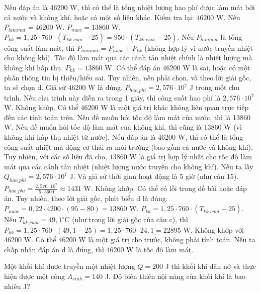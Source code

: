 \begin{ex}
{Nếu đáp án là 46200 W, thì có thể là tổng nhiệt lượng hao phí được làm mát bởi cả nước và không khí, hoặc có một số liệu khác.
Kiểm tra lại: $46200$ W.
Nếu $P_{lammat} = 46200$ W.
$P_{nuoc} = 13860$ W.
$P_{kk} = 1,25 \cdot 760 \cdot (T_{kk\_cuoi} - 25) = 950 \cdot (T_{kk\_cuoi} - 25)$.
Nếu $P_{lammat}$ là tổng công suất làm mát, thì $P_{lammat} = P_{nuoc} + P_{kk}$ (không hợp lý vì nước truyền nhiệt cho không khí).
Tốc độ làm mát qua các cánh tản nhiệt chính là nhiệt lượng mà không khí hấp thụ.
$P_{kk} = 13860$ W.
Có thể đáp án 46200 W là sai, hoặc có một phần thông tin bị thiếu/hiểu sai.
Tuy nhiên, nếu phải chọn, và theo lời giải gốc, ta sẽ chọn d.
Giả sử $46200$ W là đúng.
$P_{hao\_phi} = 2,576 \cdot 10^7$ J trong một chu trình.
Nếu chu trình này diễn ra trong 1 giây, thì công suất hao phí là $2,576 \cdot 10^7$ W.
Không khớp.
Có thể $46200$ W là một giá trị khác không liên quan trực tiếp đến các tính toán trên.
Nếu đề muốn hỏi tốc độ làm mát của nước, thì là 13860 W.
Nếu đề muốn hỏi tốc độ làm mát của không khí, thì cũng là 13860 W (vì không khí hấp thụ nhiệt từ nước).
Nếu đáp án là 46200 W, thì có thể là tổng công suất nhiệt mà động cơ thải ra môi trường (bao gồm cả nước và không khí).
Tuy nhiên, với các số liệu đã cho, $13860$ W là giá trị hợp lý nhất cho tốc độ làm mát qua các cánh tản nhiệt (nhiệt lượng nước truyền cho không khí).
Nếu ta lấy $Q_{hao\_phi} = 2,576 \cdot 10^7$ J.
Và giả sử thời gian hoạt động là 5 giờ (như câu 15).
$P_{hao\_phi} = \frac{2,576 \cdot 10^7}{5 \cdot 3600} \approx 1431$ W.
Không khớp.
Có thể có lỗi trong đề bài hoặc đáp án.
Tuy nhiên, theo lời giải gốc, phát biểu d là đúng.
$P_{nuoc} = 0,22 \cdot 4200 \cdot (95 - 80) = 13860$ W.
$P_{kk} = 1,25 \cdot 760 \cdot (T_{kk\_cuoi} - 25)$.
Nếu $T_{kk\_cuoi} = 49,1^\circ\text{C}$ (như trong lời giải gốc của câu c), thì $P_{kk} = 1,25 \cdot 760 \cdot (49,1 - 25) = 1,25 \cdot 760 \cdot 24,1 = 22895$ W.
Không khớp với 46200 W.
Có thể 46200 W là một giá trị cho trước, không phải tính toán.
Nếu ta chấp nhận đáp án d là đúng, thì 46200 W là tốc độ làm mát.
}
\end{ex}


\begin{ex}
Một khối khí được truyền một nhiệt lượng $Q = 200$ J thì khối khí dãn nở và thực hiện được một công $A_{sinh} = 140$ J. Độ biến thiên nội năng của khối khí là bao nhiêu J?
\end{ex}

